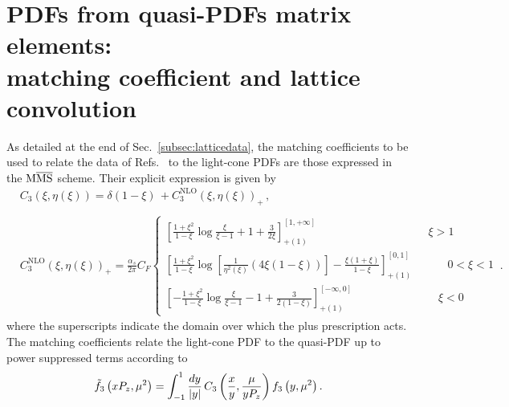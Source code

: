 \chapter{PDFs from quasi-PDFs matrix elements: \\
matching coefficient and lattice convolution}
\label{app:coefficients}
As detailed at the end of Sec.~\ref{subsec:latticedata}, the matching coefficients to be
used to relate the data of Refs.~\cite{Alexandrou:2018pbm,Alexandrou:2019lfo} to the light-cone PDFs
are those expressed in the ${\rm M}\overline{\mathrm{MS}}$ scheme. Their explicit expression is given
by \cite{Alexandrou:2018pbm,Alexandrou:2019lfo}
\begin{equation}
	\label{eq::matching}
	\begin{split}
		&C_{3}\left(\xi,\eta\left(\xi\right) \right)= \delta\left(1-\xi\right)\, +  C_{3}^{\text{NLO}}\left(\xi,\eta\left(\xi\right) \right)_+\,,  \\ \\ 
		& C_{3}^{\text{NLO}}\left(\xi,\eta\left(\xi\right) \right)_+ =  \frac{\alpha_s}{2\pi}C_F \begin{cases} \left[\frac{1+\xi^2}{1-\xi}\log{\frac{\xi}{\xi-1}} + 1 + \frac{3}{2\xi}\right]^{\left[1,+\infty\right]}_{+(1)} \,\,\,\,\,\,\,\,\,\,\,\,\,\,\,\,\,\,\,\,\,\,\,\,\,\,\,\,\,\,\,\,\,\,\,\,\,\,\,\,\,\,\,\,\,\,\,\,\,\,\,\,\,\,\,\,\,\,\,\, \xi > 1\\ \left[\frac{1+\xi^2}{1-\xi}\log\left[{\frac{1}{\eta^2\left(\xi\right)}}\left(4\xi\left(1-\xi\right)\right)\right]  -\frac{\xi\left(1+\xi\right)}{1-\xi}\right]^{\left[0,1\right]}_{+(1)}\,\,\,\,\,\,\,\,\,\,\,\,\,\,\,\,\,\,\, 0<\xi < 1 \\ \left[-\frac{1+\xi^2}{1-\xi}\log{\frac{\xi}{\xi-1}} - 1 + \frac{3}{2\left(1-\xi\right)}\right]^{\left[-\infty,0\right]}_{+(1)} \,\,\,\,\,\,\,\,\,\,\,\,\,\,\,\,\,\,\,\,\,\,\,\,\,\,\,\,\,\,\,\,\,\,\,\,\,\,\,\,\,\,\,\,\,\, \xi<0\end{cases}\, .
	\end{split}
\end{equation}
where the superscripts indicate the domain over which the plus prescription acts.
The matching coefficients relate the light-cone PDF to the quasi-PDF up to power suppressed terms
according to
\begin{align}
	\label{eq::matchingfud}                                   
	\tilde{f}_{3}\left( x P_z, {\mu}^2 \right) =              
	\int_{-1}^{1} \frac{dy}{|y|}\, C_{3}\left(\frac{x}{y},\frac{\mu}{y P_z}\right)  
	f_{3}\left( y, {\mu}^2\right). 
\end{align}
